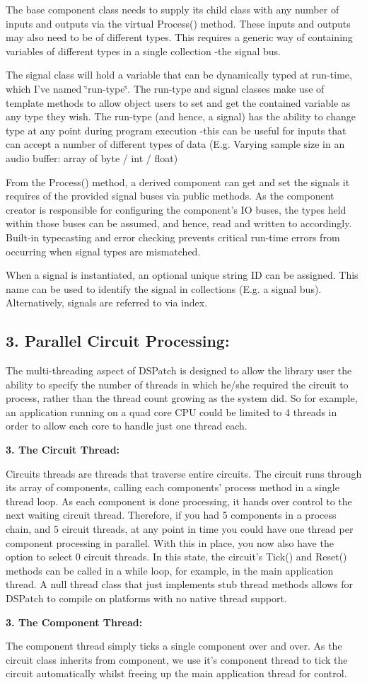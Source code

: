 The base component class needs to supply its child class with any number of inputs and outputs via the virtual Process() method. These inputs and outputs may also need to be of different types. This requires a generic way of containing variables of different types in a single collection -\/the signal bus.

The signal class will hold a variable that can be dynamically typed at run-\/time, which I've named \char`\"{}run-\/type\char`\"{}. The run-\/type and signal classes make use of template methods to allow object users to set and get the contained variable as any type they wish. The run-\/type (and hence, a signal) has the ability to change type at any point during program execution -\/this can be useful for inputs that can accept a number of different types of data (E.\-g. Varying sample size in an audio buffer\-: array of byte / int / float)

From the Process() method, a derived component can get and set the signals it requires of the provided signal buses via public methods. As the component creator is responsible for configuring the component's I\-O buses, the types held within those buses can be assumed, and hence, read and written to accordingly. Built-\/in typecasting and error checking prevents critical run-\/time errors from occurring when signal types are mismatched.

When a signal is instantiated, an optional unique string I\-D can be assigned. This name can be used to identify the signal in collections (E.\-g. a signal bus). Alternatively, signals are referred to via index.





\subsection*{3. Parallel Circuit Processing\-:}

The multi-\/threading aspect of D\-S\-Patch is designed to allow the library user the ability to specify the number of threads in which he/she required the circuit to process, rather than the thread count growing as the system did. So for example, an application running on a quad core C\-P\-U could be limited to 4 threads in order to allow each core to handle just one thread each.

{\bfseries 3. The Circuit Thread\-:}

Circuits threads are threads that traverse entire circuits. The circuit runs through its array of components, calling each components' process method in a single thread loop. As each component is done processing, it hands over control to the next waiting circuit thread. Therefore, if you had 5 components in a process chain, and 5 circuit threads, at any point in time you could have one thread per component processing in parallel. With this in place, you now also have the option to select 0 circuit threads. In this state, the circuit's Tick() and Reset() methods can be called in a while loop, for example, in the main application thread. A null thread class that just implements stub thread methods allows for D\-S\-Patch to compile on platforms with no native thread support.

{\bfseries 3. The Component Thread\-:}

The component thread simply ticks a single component over and over. As the circuit class inherits from component, we use it's component thread to tick the circuit automatically whilst freeing up the main application thread for control. 